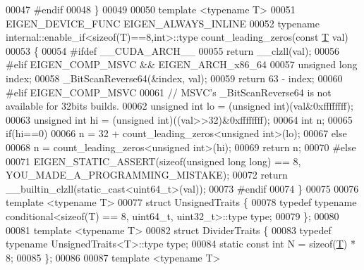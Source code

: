 \begin{DoxyCode}
00047 \textcolor{preprocessor}{#endif}
00048   \}
00049 
00050   \textcolor{keyword}{template} <\textcolor{keyword}{typename} T>
00051   EIGEN\_DEVICE\_FUNC EIGEN\_ALWAYS\_INLINE
00052   \textcolor{keyword}{typename} internal::enable\_if<sizeof(T)==8,int>::type count\_leading\_zeros(\textcolor{keyword}{const} 
      \hyperlink{group___sparse_core___module_class_eigen_1_1_triplet}{T} val)
00053   \{
00054 \textcolor{preprocessor}{#ifdef \_\_CUDA\_ARCH\_\_}
00055     \textcolor{keywordflow}{return} \_\_clzll(val);
00056 \textcolor{preprocessor}{#elif EIGEN\_COMP\_MSVC && EIGEN\_ARCH\_x86\_64}
00057     \textcolor{keywordtype}{unsigned} \textcolor{keywordtype}{long} index;
00058     \_BitScanReverse64(&index, val);
00059     \textcolor{keywordflow}{return} 63 - index;
00060 \textcolor{preprocessor}{#elif EIGEN\_COMP\_MSVC}
00061     \textcolor{comment}{// MSVC's \_BitScanReverse64 is not available for 32bits builds.}
00062     \textcolor{keywordtype}{unsigned} \textcolor{keywordtype}{int} lo = (\textcolor{keywordtype}{unsigned} int)(val&0xffffffff);
00063     \textcolor{keywordtype}{unsigned} \textcolor{keywordtype}{int} hi = (\textcolor{keywordtype}{unsigned} int)((val>>32)&0xffffffff);
00064     \textcolor{keywordtype}{int} n;
00065     \textcolor{keywordflow}{if}(hi==0)
00066       n = 32 + count\_leading\_zeros<unsigned int>(lo);
00067     \textcolor{keywordflow}{else}
00068       n = count\_leading\_zeros<unsigned int>(hi);
00069     \textcolor{keywordflow}{return} n;
00070 \textcolor{preprocessor}{#else}
00071     EIGEN\_STATIC\_ASSERT(\textcolor{keyword}{sizeof}(\textcolor{keywordtype}{unsigned} \textcolor{keywordtype}{long} \textcolor{keywordtype}{long}) == 8, YOU\_MADE\_A\_PROGRAMMING\_MISTAKE);
00072     \textcolor{keywordflow}{return} \_\_builtin\_clzll(static\_cast<uint64\_t>(val));
00073 \textcolor{preprocessor}{#endif}
00074   \}
00075 
00076   \textcolor{keyword}{template} <\textcolor{keyword}{typename} T>
00077   \textcolor{keyword}{struct }UnsignedTraits \{
00078     \textcolor{keyword}{typedef} \textcolor{keyword}{typename} conditional<sizeof(T) == 8, uint64\_t, uint32\_t>::type type;
00079   \};
00080 
00081   \textcolor{keyword}{template} <\textcolor{keyword}{typename} T>
00082   \textcolor{keyword}{struct }DividerTraits \{
00083     \textcolor{keyword}{typedef} \textcolor{keyword}{typename} UnsignedTraits<T>::type type;
00084     \textcolor{keyword}{static} \textcolor{keyword}{const} \textcolor{keywordtype}{int} N = \textcolor{keyword}{sizeof}(\hyperlink{group___sparse_core___module_class_eigen_1_1_triplet}{T}) * 8;
00085   \};
00086 
00087   \textcolor{keyword}{template} <\textcolor{keyword}{typename} T>

\end{DoxyCode}
